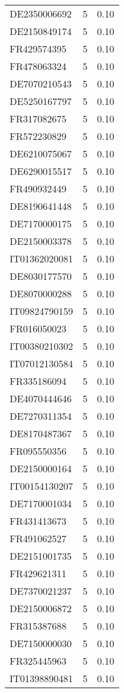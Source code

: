 \begin{table*}[htbp]
\begin{tabular}{lrr}
DE2350006692 & 5 & 0.10 \\
DE2150849174 & 5 & 0.10 \\
FR429574395 & 5 & 0.10 \\
FR478063324 & 5 & 0.10 \\
DE7070210543 & 5 & 0.10 \\
DE5250167797 & 5 & 0.10 \\
FR317082675 & 5 & 0.10 \\
FR572230829 & 5 & 0.10 \\
DE6210075067 & 5 & 0.10 \\
DE6290015517 & 5 & 0.10 \\
FR490932449 & 5 & 0.10 \\
DE8190641448 & 5 & 0.10 \\
DE7170000175 & 5 & 0.10 \\
DE2150003378 & 5 & 0.10 \\
IT01362020081 & 5 & 0.10 \\
DE8030177570 & 5 & 0.10 \\
DE8070000288 & 5 & 0.10 \\
IT09824790159 & 5 & 0.10 \\
FR016050023 & 5 & 0.10 \\
IT00380210302 & 5 & 0.10 \\
IT07012130584 & 5 & 0.10 \\
FR335186094 & 5 & 0.10 \\
DE4070444646 & 5 & 0.10 \\
DE7270311354 & 5 & 0.10 \\
DE8170487367 & 5 & 0.10 \\
FR095550356 & 5 & 0.10 \\
DE2150000164 & 5 & 0.10 \\
IT00154130207 & 5 & 0.10 \\
DE7170001034 & 5 & 0.10 \\
FR431413673 & 5 & 0.10 \\
FR491062527 & 5 & 0.10 \\
DE2151001735 & 5 & 0.10 \\
FR429621311 & 5 & 0.10 \\
DE7370021237 & 5 & 0.10 \\
DE2150006872 & 5 & 0.10 \\
FR315387688 & 5 & 0.10 \\
DE7150000030 & 5 & 0.10 \\
FR325445963 & 5 & 0.10 \\
IT01398890481 & 5 & 0.10 \\

\end{tabular}
\end{table*}
